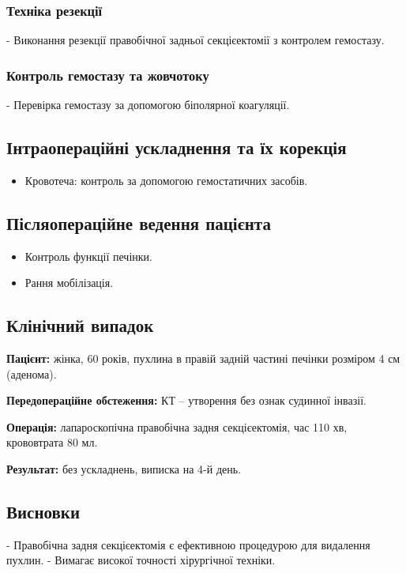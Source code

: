 \begin{refsection}
\subsubsection{Техніка резекції}
- Виконання резекції правобічної задньої секцієектомії з контролем гемостазу.

\subsubsection{Контроль гемостазу та жовчотоку}
- Перевірка гемостазу за допомогою біполярної коагуляції.

\subsection{Інтраопераційні ускладнення та їх корекція}
\begin{itemize}
    \item Кровотеча: контроль за допомогою гемостатичних засобів.
\end{itemize}

\subsection{Післяопераційне ведення пацієнта}
\begin{itemize}
    \item Контроль функції печінки.
    \item Рання мобілізація.
\end{itemize}

\subsection{Клінічний випадок}
\textbf{Пацієнт:} жінка, 60 років, пухлина в правій задній частині печінки розміром 4 см (аденома).

\textbf{Передопераційне обстеження:} КТ – утворення без ознак судинної інвазії.

\textbf{Операція:} лапароскопічна правобічна задня секцієектомія, час 110 хв, крововтрата 80 мл.

\textbf{Результат:} без ускладнень, виписка на 4-й день.

\subsection{Висновки}
- Правобічна задня секцієектомія є ефективною процедурою для видалення пухлин.
- Вимагає високої точності хірургічної техніки.


\end{refsection}

